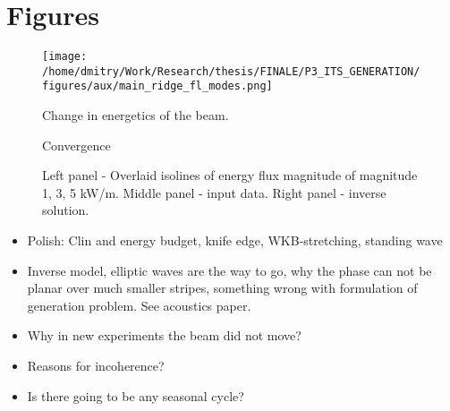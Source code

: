 \documentclass[12pt]{article}
\begin{document}
\newpage
\section{Figures}

\begin{figure}
\end{figure}
\begin{figure}
\centering
\texttt{[image: /home/dmitry/Work/Research/thesis/FINALE/P3\_ITS\_GENERATION/figures/aux/main\_ridge\_fl\_modes.png]}
\caption{Change in energetics of the beam.}
\end{figure}

\begin{figure}
\centering
{}
\caption{Convergence}
\end{figure}

\begin{figure}
\centering
{}
\caption{Left panel - Overlaid isolines of energy flux magnitude of magnitude 1, 3, 5 kW/m. Middle panel - input data. Right panel - inverse solution.}
\end{figure}


\begin{itemize}
\item Polish: Clin and energy budget, knife edge, WKB-stretching, standing wave
\item Inverse model, elliptic waves are the way to go, why the phase can not be planar over much smaller stripes, something wrong with formulation of generation problem. See acoustics paper.
\item Why in new experiments the beam did not move?
\item Reasons for incoherence?
\item Is there going to be any seasonal cycle?
\end{itemize}



\end{document}
